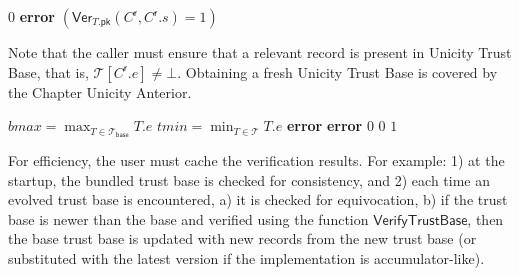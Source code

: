 \begin{algorithmic}[0]
        \State \Return $0$
    \EndIf
      \State \Return \textbf{error}  
    \EndIf
    \State \Return $(\mathsf{Ver}_{T.\mathsf{pk}}(C^\mathsf{r}, C^\mathsf{r}.s) = 1)$  
  \EndFunction
\end{algorithmic}

Note that the caller must ensure that a relevant record is present in Unicity Trust Base, that is, $\mathcal{T}[C^\mathsf{r}.e] \ne \bot$. Obtaining a fresh Unicity Trust Base is covered by the Chapter Unicity Anterior.

\begin{algorithmic}[0]

    \State $bmax = \max_{T \in \mathcal{T}_\mathsf{base}} T.e$  
    \State $tmin = \min_{T \in \mathcal{T}} T.e$ 
        \State \Return \textbf{error}  
    \EndIf
          \State \Return \textbf{error}  
       \EndIf
    \EndFor
       
          \State \Return $0$
       \EndIf
    \EndFor
     
          \State \Return $0$
       \EndIf
    \EndFor
    \State \Return $1$
  \EndFunction
\end{algorithmic}

For efficiency, the user must cache the verification results. For example: 1) at the startup, the bundled trust base is checked for consistency, and 2) each time an evolved trust base is encountered, a) it is checked for equivocation, b) if the trust base is newer than the base and verified using the function $\mathsf{VerifyTrustBase}$, then the base trust base is updated with new records from the new trust base (or substituted with the latest version if the implementation is accumulator-like).

